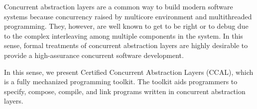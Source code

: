 
Concurrent abstraction layers are a common way to 
build modern software systems 
because concurrency raised by multicore environment and multithreaded programming. 
They, however, are well known to get to be right or to debug due to 
the complex interleaving among multiple components in the system. 
In this sense, formal treatments of concurrent abstraction layers 
are highly desirable to provide a 
high-assurance concurrent software development. 

In this sense, we present Certified Concurrent Abstraction Layers (CCAL), which is a fully mechanized programming toolkit.
The toolkit aids programmers to specify, compose, compile, and link programs written in
concurrent abstraction layers. 

